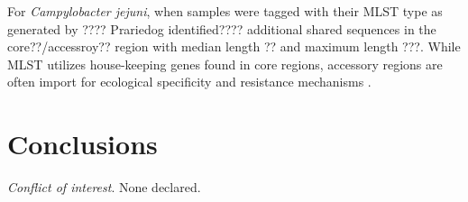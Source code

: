 \documentclass{article}
\begin{document}

For \textit{Campylobacter jejuni}, when samples were tagged with their MLST type as generated by ???? Prariedog identified???? additional shared sequences in the core??/accessroy?? region with median length ?? and maximum length ???. %
While MLST utilizes house-keeping genes found in core regions, accessory regions are often import for ecological specificity and resistance mechanisms \cite{fraser2009bacterial}.

\section{Conclusions}


\textit{Conflict of interest}. None declared.

\newpage



\end{document}
